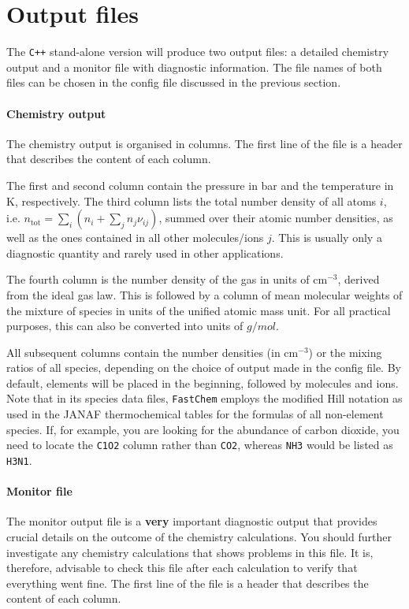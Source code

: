 \documentclass[numbers=noenddot]{fcmanual}
\newcommand{\fc}{\texttt{FastChem}\xspace}
\newcommand{\cpp}{\ttt{C++}\xspace}
\newcommand{\ttt}[1]{\texttt {#1}}
\begin{document}
\section{Output files}
\label{sec:fc_cpp_output}

The \cpp stand-alone version will produce two output files: a detailed chemistry output and a monitor file with diagnostic information. The file names of both files can be chosen in the config file discussed in the previous section.

\paragraph{Chemistry output} 
The chemistry output is organised in columns. The first line of the file is a header that describes the content of each column.

The first and second column contain the pressure in bar and the temperature in K, respectively. The third column lists the total number density of all atoms $i$, i.e. $n_\mathrm{tot} = \sum_i \left( n_i + \sum_j n_j \nu_{ij} \right)$, summed over their atomic number densities, as well as the ones contained in all other molecules/ions $j$. This is usually only a diagnostic quantity and rarely used in other applications. 

The fourth column is the number density of the gas in units of cm$^{-3}$, derived from the ideal gas law. This is followed by a column of mean molecular weights of the mixture of species in units of the unified atomic mass unit. For all practical purposes, this can also be converted into units of $\unit{g/mol}$.

All subsequent columns contain the number densities (in cm$^{-3}$) or the mixing ratios of all species, depending on the choice of output made in the config file. By default, elements will be placed in the beginning, followed by molecules and ions. Note that in its species data files, \fc employs the modified Hill notation as used in the JANAF thermochemical tables \citep{Chase1986jtt..book.....C} for the formulas of all non-element species. If, for example, you are looking for the abundance of carbon dioxide, you need to locate the \verb|C1O2| column rather than \verb|CO2|, whereas \verb|NH3| would be listed as \verb|H3N1|.

\paragraph{Monitor file} The monitor output file is a \textbf{very} important diagnostic output that provides crucial details on the outcome of the chemistry calculations. You should further investigate any chemistry calculations that shows problems in this file. It is, therefore, advisable to check this file after each calculation to verify that everything went fine. The first line of the file is a header that describes the content of each column.
\end{document}
